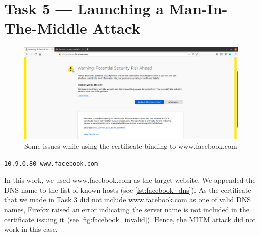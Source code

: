 \section{Task 5 --- Launching a Man-In-The-Middle Attack}
%
\begin{figure}
    \centering
    \includegraphics[height=\textheight,width=\textwidth,keepaspectratio]
    {figures/facebook_invalid_cert.png}
    \caption{Some issues while using the certificate binding to
    {\selectfont www.facebook.com}}
    \label{fig:facebook_invalid}
\end{figure}

\begin{lstlisting}[caption=Append {\fontfamily{qcr}\selectfont
    www.facebook.com} to the list of known hosts,
    label={lst:facebook_dns}]
    10.9.0.80 www.facebook.com
\end{lstlisting}

In this work, we used {\selectfont www.facebook.com} as the target
website. We appended the DNS name to the list of known hosts (see \autoref{lst:facebook_dns}).
As the certificate that we made in Task 3 did not include {\selectfont
www.facebook.com} as one of valid DNS names, Firefox raised an error indicating the server
name is not included in the certificate issuing it (see \autoref{fig:facebook_invalid}).
Hence, the MITM attack did not work in this case.  